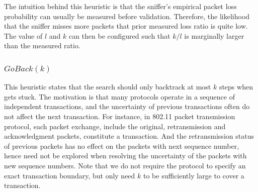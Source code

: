 The intuition behind this heuristic is that the sniffer's empirical packet loss
probability can usually be measured before validation. Therefore, the likelihood
that the sniffer misses more packets that prior measured loss ratio is quite
low. The value of $l$ and $k$ can then be configured such that $k/l$ is marginally
larger than the measured ratio.

\vspace*{-3mm}
\subsubsection{$\mathit{GoBack}(k)$}

This heuristic states that the search should only
backtrack at most $k$ steps when gets stuck.
The motivation is that many protocols operate in a sequence of independent
transactions, and the uncertainty of previous transactions often do not affect
the next transaction.
For instance, in 802.11 packet transmission protocol, each packet exchange,
include the original, retransmission and acknowledgment packets, constitute a
transaction.
And the retransmission status of previous packets has no effect on the packets
with next sequence number, hence need not be explored when resolving the
uncertainty of the packets with new sequence numbers.  Note that we do not
require the protocol to specify an exact transaction boundary, but only need $k$
to be sufficiently large to cover a transaction. 

